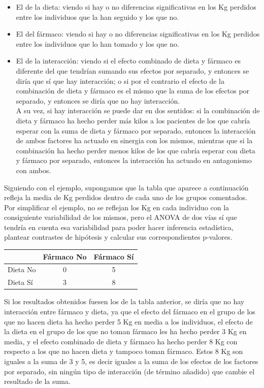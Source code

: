 \documentclass[
  a4paper,
]{scrreport}
\theoremstyle{plain}
\theoremstyle{definition}
\theoremstyle{definition}
\theoremstyle{remark}
\begin{document}
\begin{itemize}
\item
  El de la dieta: viendo si hay o no diferencias significativas en los
  Kg perdidos entre los individuos que la han seguido y los que no.
\item
  El del fármaco: viendo si hay o no diferencias significativas en los
  Kg perdidos entre los individuos que lo han tomado y los que no.
\item
  El de la interacción: viendo si el efecto combinado de dieta y fármaco
  es diferente del que tendrían sumando sus efectos por separado, y
  entonces se diría que sí que hay interacción; o si por el contrario el
  efecto de la combinación de dieta y fármaco es el mismo que la suma de
  los efectos por separado, y entonces se diría que no hay
  interacción.\\
  A su vez, si hay interacción se puede dar en dos sentidos: si la
  combinación de dieta y fármaco ha hecho perder más kilos a los
  pacientes de los que cabría esperar con la suma de dieta y fármaco por
  separado, entonces la interacción de ambos factores ha actuado en
  sinergia con los mismos, mientras que si la combinación ha hecho
  perder menos kilos de los que cabría esperar con dieta y fármaco por
  separado, entonces la interacción ha actuado en antagonismo con ambos.
\end{itemize}

Siguiendo con el ejemplo, supongamos que la tabla que aparece a
continuación refleja la media de Kg perdidos dentro de cada uno de los
grupos comentados. Por simplificar el ejemplo, no se reflejan los Kg en
cada individuo con la consiguiente variabilidad de los mismos, pero el
ANOVA de dos vías sí que tendría en cuenta esa variabilidad para poder
hacer inferencia estadística, plantear contrastes de hipótesis y
calcular sus correspondientes p-valores.

\begin{longtable}[]{@{}lcc@{}}
\toprule\noalign{}
& Fármaco No & Fármaco Sí \\
\midrule\noalign{}
\endhead
\bottomrule\noalign{}
\endlastfoot
Dieta No & 0 & 5 \\
Dieta Sí & 3 & 8 \\
\end{longtable}

Si los resultados obtenidos fuesen los de la tabla anterior, se diría
que no hay interacción entre fármaco y dieta, ya que el efecto del
fármaco en el grupo de los que no hacen dieta ha hecho perder 5 Kg en
media a los individuos, el efecto de la dieta en el grupo de los que no
toman fármaco les ha hecho perder 3 Kg en media, y el efecto combinado
de dieta y fármaco ha hecho perder 8 Kg con respecto a los que no hacen
dieta y tampoco toman fármaco. Estos 8 Kg son iguales a la suma de 3 y
5, es decir iguales a la suma de los efectos de los factores por
separado, sin ningún tipo de interacción (de término añadido) que cambie
el resultado de la suma.
\end{document}
